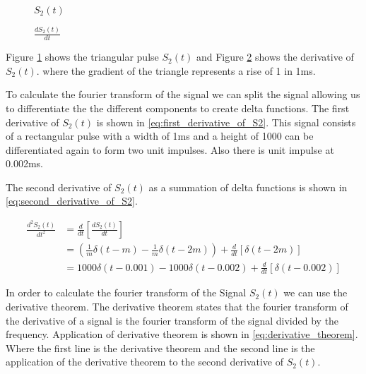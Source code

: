 \begin{figure}[ht!]
	\centering
	
	\caption{$S_{2}(t)$}\label{fig:S2}
\end{figure}\FloatBarrier

\begin{figure}[ht!]
	\centering
	
	\caption{$\frac{dS_{2}\left(t\right)}{dt}$}\label{fig:dS2}
\end{figure}\FloatBarrier



Figure \ref{fig:S2} shows the triangular pulse $S_{2}(t)$ and Figure \ref{fig:dS2} shows the derivative of $S_{2}(t)$. where the gradient of the triangle represents a rise of 1 in 1ms.

To calculate the fourier transform of the signal we can split the signal allowing us to differentiate the the different components to create delta functions. The first derivative of $S_{2}(t)$ is shown in \eqref{eq:first_derivative_of_S2}. This signal consists of a rectangular pulse with a width of 1ms and a height of 1000 can be differentiated again to form two unit impulses. Also there is unit impulse at 0.002ms.

The second derivative of $S_{2}(t)$ as a summation of delta functions is shown in \eqref{eq:second_derivative_of_S2}. 

\begin{equation}
	\begin{split}
		\frac{d^{2}S_{2}\left(t\right)}{dt^{2}} &= \frac{d}{dt}\left[\frac{dS_{2}\left(t\right)}{dt}\right]\\
		&= \left(\frac{1}{m}\delta\left(t - m\right) - \frac{1}{m}\delta\left(t - 2m\right)\right) + \frac{d}{dt}\left[\delta\left(t - 2m\right)\right]\\
		&= 1000\delta\left(t - 0.001\right) - 1000\delta\left(t - 0.002\right) + \frac{d}{dt}\left[\delta\left(t - 0.002\right)\right]
	\end{split}
	\label{eq:second_derivative_of_S2}
\end{equation}

In order to calculate the fourier transform of the Signal $S_{2}(t)$ we can use the derivative theorem. The derivative theorem states that the fourier transform of the derivative of a signal is the fourier transform of the signal divided by the frequency. Application of derivative theorem is shown in \eqref{eq:derivative_theorem}. Where the first line is the derivative theorem and the second line is the application of the derivative theorem to the second derivative of $S_{2}(t)$.

